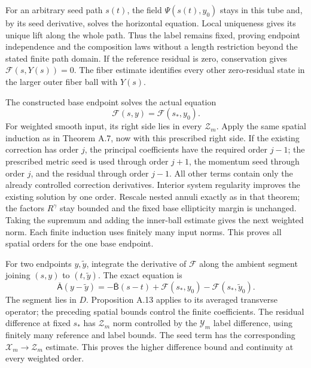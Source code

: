 \documentclass[
  english,
  11pt,
  reqno]{amsart}
\begin{document}
For an arbitrary seed path \(s(t)\), the field \(\Psi(s(t),y_0)\) stays
in this tube and, by its seed derivative, solves the horizontal
equation. Local uniqueness gives its unique lift along the whole path.
Thus the label remains fixed, proving endpoint independence and the
composition laws without a length restriction beyond the stated finite
path domain. If the reference residual is zero, conservation gives
\(\mathcal F(s,Y(s))=0\). The fiber estimate identifies every other
zero-residual state in the larger outer fiber ball with \(Y(s)\).

The constructed base endpoint solves the actual equation%
 \[
\mathcal F(s,y)=\mathcal F(s_*,y_0).
\] For weighted smooth input, its right side lies in every
\(\mathcal Z_m\). Apply the same spatial induction as in Theorem A.7,
now with this prescribed right side. If the existing correction has
order \(j\), the principal coefficients have the required order \(j-1\);
the prescribed metric seed is used through order \(j+1\), the momentum
seed through order \(j\), and the residual through order \(j-1\). All
other terms contain only the already controlled correction derivatives.
Interior system regularity improves the existing solution by one order.
Rescale nested annuli exactly as in that theorem; the factors
\(R^\gamma\) stay bounded and the fixed base ellipticity margin is
unchanged. Taking the supremum and adding the inner-ball estimate gives
the next weighted norm. Each finite induction uses finitely many input
norms. This proves all spatial orders for the one base endpoint.

For two endpoints \(y,\widetilde y\), integrate the derivative of
\(\mathcal F\) along the ambient segment joining \((s,y)\) to
\((t,\widetilde y)\). The exact equation is%
 \[
\overline{\mathsf A}(y-\widetilde y)
=-\overline{\mathsf B}(s-t)
+\mathcal F(s_*,y_0)-\mathcal F(s_*,\widetilde y_0).
\] The segment lies in \(D\). Proposition A.13 applies to its averaged
transverse operator; the preceding spatial bounds control the finite
coefficients. The residual difference at fixed \(s_*\) has
\(\mathcal Z_m\) norm controlled by the \(\mathcal Y_m\) label
difference, using finitely many reference and label bounds. The seed
term has the corresponding \(\mathcal X_m\to\mathcal Z_m\) estimate.
This proves the higher difference bound and continuity at every weighted
order.
\end{document}
